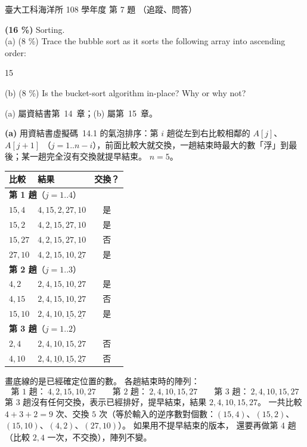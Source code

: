 \begin{pastexam}[label={px:ntu-108-esoe-ds-07}]{臺大工科海洋所 108 學年度 第 7 題}
（追蹤、問答）

\textbf{(16 \%)} Sorting.\\
(a) (8 \%) Trace the bubble sort as it sorts the following array into ascending order:
\begin{center}15\end{center}
(b) (8 \%) Is the bucket-sort algorithm in-place? Why or why not?
\end{pastexam}

\begin{pastsoln}
(a) 屬資結書第~14~章；(b) 屬第~15~章。

\textbf{(a)} 用資結書虛擬碼~14.1 的氣泡排序：第 $i$ 趟從左到右比較相鄰的 $A[j]$、$A[j + 1]$
（$j = 1..n - i$），前面比較大就交換，一趟結束時最大的數「浮」到最後；某一趟完全沒有交換就提早結束。
$n = 5$。

\begin{center}
\begin{tabular}{llc}
\toprule
比較 & 結果 & 交換？ \\
\midrule
\multicolumn{3}{l}{\textbf{第 1 趟}（$j = 1..4$）} \\
$15, 4$ & $4, 15, 2, 27, 10$ & 是 \\
$15, 2$ & $4, 2, 15, 27, 10$ & 是 \\
$15, 27$ & $4, 2, 15, 27, 10$ & 否 \\
$27, 10$ & $4, 2, 15, 10, \underline{27}$ & 是 \\
\midrule
\multicolumn{3}{l}{\textbf{第 2 趟}（$j = 1..3$）} \\
$4, 2$ & $2, 4, 15, 10, 27$ & 是 \\
$4, 15$ & $2, 4, 15, 10, 27$ & 否 \\
$15, 10$ & $2, 4, 10, \underline{15}, \underline{27}$ & 是 \\
\midrule
\multicolumn{3}{l}{\textbf{第 3 趟}（$j = 1..2$）} \\
$2, 4$ & $2, 4, 10, 15, 27$ & 否 \\
$4, 10$ & $2, 4, \underline{10}, \underline{15}, \underline{27}$ & 否 \\
\bottomrule
\end{tabular}
\end{center}
畫底線的是已經確定位置的數。 各趟結束時的陣列：
\[
\text{第 1 趟：}\ 4, 2, 15, 10, 27 \qquad
\text{第 2 趟：}\ 2, 4, 10, 15, 27 \qquad
\text{第 3 趟：}\ 2, 4, 10, 15, 27
\]
第 3 趟沒有任何交換，表示已經排好，提早結束，結果 $2, 4, 10, 15, 27$。 一共比較 $4 + 3 + 2 = 9$ 次、交換
$5$ 次（等於輸入的逆序數對個數：$(15,4)$、$(15,2)$、$(15,10)$、$(4,2)$、$(27,10)$）。 如果用不提早結束的版本，
還要再做第 4 趟（比較 $2, 4$ 一次，不交換），陣列不變。


\end{pastsoln}
